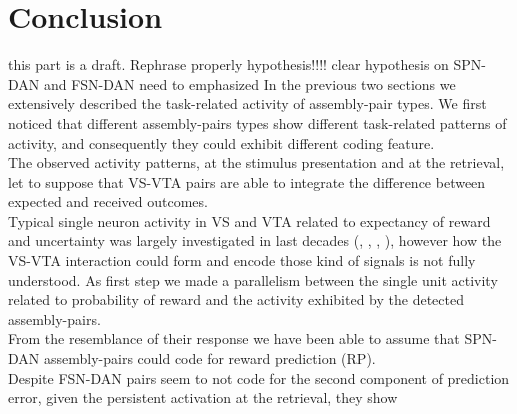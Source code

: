 \section{Conclusion}
{\color{red} this part is a draft. Rephrase properly hypothesis!!!! clear hypothesis on SPN-DAN and FSN-DAN need to emphasized }
In the previous two sections we extensively described the task-related activity of assembly-pair types. We first noticed that different assembly-pairs types show different task-related patterns of activity, and consequently they could exhibit different coding feature.\\The observed activity patterns, at the stimulus presentation and at the retrieval, let to suppose that VS-VTA pairs are able to integrate the difference between expected and received outcomes.\\ Typical single neuron activity in VS and VTA related to expectancy of reward and uncertainty was largely investigated in last decades (\cite{Fiorillo}, \cite{Schultz}, \cite{Schultz1992}, \cite{Schultz1998}), however how the VS-VTA interaction could form and encode those kind of signals is not fully understood. As first step we made a parallelism between the single unit activity related to probability of reward and the activity exhibited by the detected assembly-pairs.\\From the resemblance of their response we have been able to assume that SPN-DAN assembly-pairs could code for reward prediction (RP).\\Despite FSN-DAN pairs seem to not code for the second component of prediction error, given the persistent activation at the retrieval, they show 

